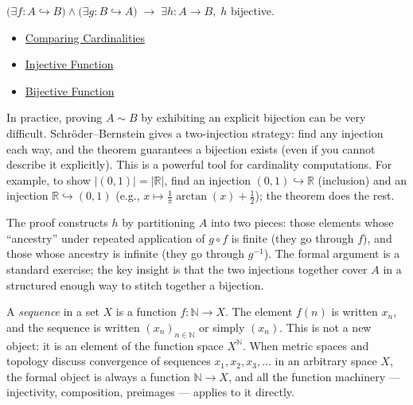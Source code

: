 \begin{remark*}
$\bigl(\exists f: A\hookrightarrow B\bigr) \wedge \bigl(\exists g: B\hookrightarrow A\bigr) \;\to\; \exists h: A\to B,\; h$ bijective.
\end{remark*}


\begin{dependencies}
\begin{itemize}
  \item \hyperref[def:cardinality-order]{Comparing Cardinalities}
  \item \hyperref[def:injective]{Injective Function}
  \item \hyperref[def:bijective]{Bijective Function}
\end{itemize}
\end{dependencies}

\begin{remark*}
In practice, proving $A \sim B$ by exhibiting an explicit bijection can be
very difficult. Schröder--Bernstein gives a two-injection strategy: find any
injection each way, and the theorem guarantees a bijection exists (even if
you cannot describe it explicitly). This is a powerful tool for cardinality
computations. For example, to show $|(0,1)| = |\mathbb{R}|$, find an
injection $(0,1) \hookrightarrow \mathbb{R}$ (inclusion) and an injection
$\mathbb{R} \hookrightarrow (0,1)$ (e.g., $x \mapsto \frac{1}{\pi}
\arctan(x) + \frac{1}{2}$); the theorem does the rest.
\end{remark*}

\begin{remark*}
The proof constructs $h$ by partitioning $A$ into two pieces: those elements
whose ``ancestry'' under repeated application of $g \circ f$ is finite (they
go through $f$), and those whose ancestry is infinite (they go through
$g^{-1}$). The formal argument is a standard exercise; the key insight is that
the two injections together cover $A$ in a structured enough way to stitch
together a bijection.
\end{remark*}

\begin{remark*}
\label{rem:sequences-as-functions}
A \emph{sequence} in a set $X$ is a function $f : \mathbb{N} \to X$. The
element $f(n)$ is written $x_n$, and the sequence is written $(x_n)_{n \in
\mathbb{N}}$ or simply $(x_n)$. This is not a new object: it is an element
of the function space $X^{\mathbb{N}}$. When metric spaces and topology
discuss convergence of sequences $x_1, x_2, x_3, \dots$ in an arbitrary space
$X$, the formal object is always a function $\mathbb{N} \to X$, and all the
function machinery — injectivity, composition, preimages — applies to it
directly.
\end{remark*}

